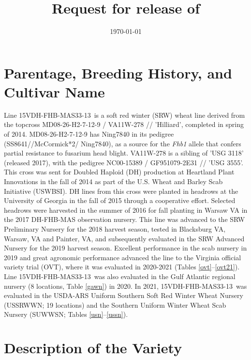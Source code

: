 \documentclass[12pt, letterpaper]{article}
\title{Request for release of \lin}
\date{\today}
\newcommand{\lin}{15VDH-FHB-MAS33-13~}
\begin{document}
\maketitle

\section{Parentage, Breeding History, and Cultivar Name}


Line \lin is a soft red winter (SRW) wheat line derived from the topcross MD08-26-H2-7-12-9 / VA11W-278 // 'Hilliard', completed in spring of 2014.  MD08-26-H2-7-12-9 has Ning7840 in its pedigree (SS8641//McCormick*2/ Ning7840), as a source for the \textit{Fhb1} allele that confers partial resistance to fusarium head blight. VA11W-278 is a sibling of 'USG 3118' (released 2017), with the pedigree NC00-15389 / GF951079-2E31 // 'USG 3555'. This cross was sent for Doubled Haploid (DH) production at Heartland Plant Innovations in the fall of 2014 as part of the U.S. Wheat and Barley Scab Initiative (USWBSI). DH lines from this cross were planted in headrows at the University of Georgia in the fall of 2015 through a cooperative effort. Selected headrows were harvested in the summer of 2016 for fall planting in Warsaw VA in the 2017 DH-FHB-MAS observation nursery. This line was advanced to the SRW Preliminary Nursery for the 2018 harvest season, tested in Blacksburg VA, Warsaw, VA and Painter, VA, and subsequently evaluated in the SRW Advanced Nursery for the 2019 harvest season. Excellent performance in the scab nursery in 2019 and great agronomic performance advanced the line to the Virginia official variety trial (OVT), where it was evaluated in 2020-2021 (Tables \ref{ovt}--\ref{ovt21}). Line \lin was also evaluated in the Gulf Atlantic regional nursery (8 locations, Table \ref{gawn}) in 2020. In 2021, \lin was evaluated in the USDA-ARS Uniform Southern Soft Red Winter Wheat Nursery (USSRWWN; 19 locations) and the Southern Uniform Winter Wheat Scab Nursery (SUWWSN; Tables \ref{usn}--\ref{ussn}). 

\section{Description of the Variety}
\end{document}

